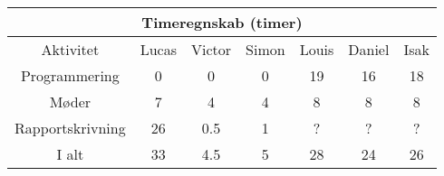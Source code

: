 \centering
\begin{tabular}{ |c|c|c|c|c|c|c|  }
 \hline
 \multicolumn{7}{|c|}{Timeregnskab (timer)} \\
 \hline
 Aktivitet & Lucas & Victor & Simon & Louis & Daniel & Isak\\
 \hline
 
 
 Programmering      & 0 & 0 & 0 & 19 & 16 & 18 \\
 
 Møder              & 7 & 4 & 4 & 8 & 8 & 8 \\
 
 Rapportskrivning   & 26 & 0.5 & 1 & ? & ? & ? \\
 
 \hline
 
 I alt              & 33 & 4.5 & 5 & 28 & 24 & 26 \\
 
 
 \hline
\end{tabular}